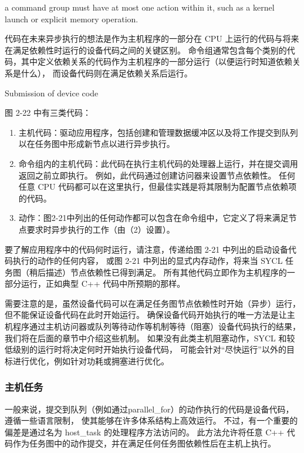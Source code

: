 \begin{remark}
	a command group must have at most one action within it, such as a kernel launch or explicit memory operation.
\end{remark}

代码在未来异步执行的想法是作为主机程序的一部分在 CPU 上运行的代码与将来在满足依赖性时运行的设备代码之间的关键区别。 
命令组通常包含每个类别的代码，其中定义依赖关系的代码作为主机程序的一部分运行（以便运行时知道依赖关系是什么），
而设备代码则在满足依赖关系后运行。

{\color{red} Submission of device code }

图 2-22 中有三类代码：

\begin{enumerate}
	\item 主机代码：驱动应用程序，包括创建和管理数据缓冲区以及将工作提交到队列以在任务图中形成新节点以进行异步执行。

	\item 命令组内的主机代码：此代码在执行主机代码的处理器上运行，并在提交调用返回之前立即执行。 
	例如，此代码通过创建访问器来设置节点依赖性。 
	任何任意 CPU 代码都可以在这里执行，但最佳实践是将其限制为配置节点依赖项的代码。

	\item 动作：图2-21中列出的任何动作都可以包含在命令组中，它定义了将来满足节点要求时异步执行的工作（由（2）设置）。
\end{enumerate}

要了解应用程序中的代码何时运行，请注意，传递给图 2-21 中列出的启动设备代码执行的动作的任何内容，
或图 2-21 中列出的显式内存动作，将来当 SYCL 任务图（稍后描述）节点依赖性已得到满足。 
所有其他代码立即作为主机程序的一部分运行，正如典型 C++ 代码中所预期的那样。

需要注意的是，虽然设备代码可以在满足任务图节点依赖性时开始（异步）运行，但不能保证设备代码在此时开始运行。 
确保设备代码开始执行的唯一方法是让主机程序通过主机访问器或队列等待动作等机制等待（阻塞）设备代码执行的结果，
我们将在后面的章节中介绍这些机制。 如果没有此类主机阻塞动作，SYCL 和较低级别的运行时将决定何时开始执行设备代码，
可能会针对“尽快运行”以外的目标进行优化，例如针对功耗或拥塞进行优化。

\subsubsection{主机任务}
一般来说，提交到队列（例如通过parallel\_for）的动作执行的代码是设备代码，遵循一些语言限制，
使其能够在许多体系结构上高效运行。 不过，有一个重要的偏差是通过名为 host\_task 的处理程序方法访问的。 
此方法允许将任意 C++ 代码作为任务图中的动作提交，并在满足任何任务图依赖性后在主机上执行。

